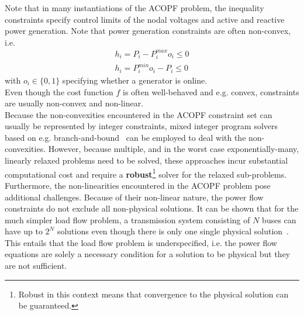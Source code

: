 \documentclass[11pt]{cmuthesis} %
\begin{document}
Note that in many instantiations of the ACOPF problem, the inequality constraints specify control limits of the nodal voltages and active and reactive power generation. Note that power generation constraints are often non-convex, i.e.
\begin{align*}
h_i = P_i - P^{max}_i o_i \leq 0\\
h_i =  P^{min}_i o_i - P_i \leq 0
\end{align*}
with $o_i \in \{0,1\}$ specifying whether a generator is online.\\
Even though the cost function $f$ is often well-behaved and e.g. convex, constraints are usually non-convex and non-linear.\\

Because the non-convexities encountered in the ACOPF constraint set can usually be represented by integer constraints, mixed integer program solvers based on e.g. branch-and-bound~\cite{lawler1966branch} can be employed to deal with the non-convexities. However, because multiple, and in the worst case exponentially-many, linearly relaxed problems need to be solved, these approaches incur substantial computational cost and require a \textbf{robust}\footnote{Robust in this context means that convergence to the physical solution can be guaranteed.} solver for the relaxed sub-problems.\\

Furthermore, the non-linearities encountered in the ACOPF problem pose additional challenges. Because of their non-linear nature, the power flow constraints do not exclude all non-physical solutions. It can be shown that for the much simpler load flow problem, a transmission system consisting of $N$ buses can have up to $2^N$ solutions even though there is only one single physical solution~\cite{thorp1997load,tamura1983relationship}. This entails that the load flow problem is underspecified, i.e. the power flow equations are solely a necessary condition for a solution to be physical but they are not sufficient.
\end{document}
